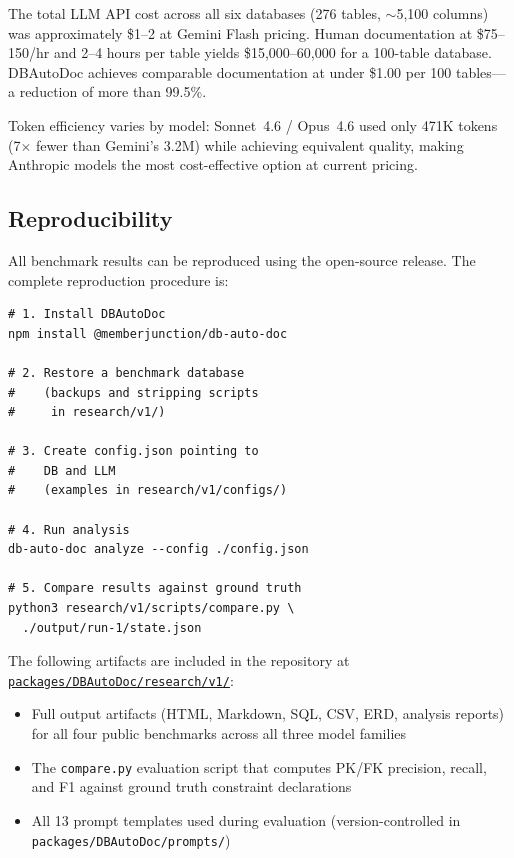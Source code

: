 \documentclass[twocolumn]{svjour3}
\begin{document}
The total LLM API cost across all six databases (276 tables, $\sim$5{,}100 columns) was approximately \$1--2 at Gemini Flash pricing. Human documentation at \$75--150/hr and 2--4 hours per table yields \$15,000--60,000 for a 100-table database. DBAutoDoc achieves comparable documentation at under \$1.00 per 100 tables---a reduction of more than 99.5\%.

Token efficiency varies by model: Sonnet~4.6 / Opus~4.6 used only 471K tokens (7$\times$ fewer than Gemini's 3.2M) while achieving equivalent quality, making Anthropic models the most cost-effective option at current pricing.

\subsection{Reproducibility}

All benchmark results can be reproduced using the open-source release. The complete reproduction procedure is:

\begin{verbatim}
# 1. Install DBAutoDoc
npm install @memberjunction/db-auto-doc

# 2. Restore a benchmark database
#    (backups and stripping scripts
#     in research/v1/)

# 3. Create config.json pointing to
#    DB and LLM
#    (examples in research/v1/configs/)

# 4. Run analysis
db-auto-doc analyze --config ./config.json

# 5. Compare results against ground truth
python3 research/v1/scripts/compare.py \
  ./output/run-1/state.json
\end{verbatim}

The following artifacts are included in the repository at \href{https://github.com/MemberJunction/MJ/tree/next/packages/DBAutoDoc/research/v1}{\texttt{packages/DBAutoDoc/research/v1/}}:
\begin{itemize}
    \item Full output artifacts (HTML, Markdown, SQL, CSV, ERD, analysis reports) for all four public benchmarks across all three model families
    \item The \texttt{compare.py} evaluation script that computes PK/FK precision, recall, and F1 against ground truth constraint declarations
    \item All 13 prompt templates used during evaluation (version-controlled in \texttt{packages/DBAutoDoc/prompts/})
\end{itemize}
\end{document}

